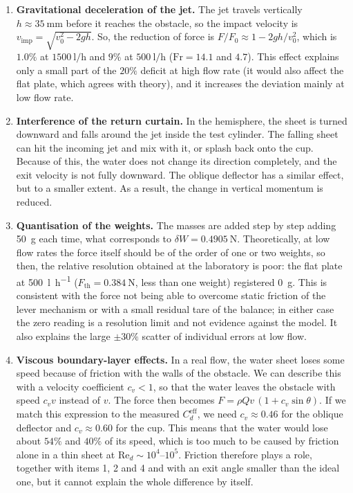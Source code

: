\documentclass[11pt,a4paper]{article}
\numberwithin{equation}{section}
\newcommand{\Cd}{C_d}
\newcommand{\Red}{\mathrm{Re}_d}
\newcommand{\Fth}{F_{\mathrm{th}}}
\begin{document}
\begin{enumerate}[leftmargin=1.5em, itemsep=0.4em]
  \item \textbf{Gravitational deceleration of the jet.} The jet travels vertically $h\approx\SI{35}{\milli\metre}$ before it reaches the obstacle, so the impact velocity is $v_{\mathrm{imp}}=\sqrt{v_0^2-2gh}$. So, the reduction of force is $F/F_0\approx 1-2gh/v_0^2$, which is $1.0\%$ at $\SI{1500}{\litre\per\hour}$ and $9\%$ at $\SI{500}{\litre\per\hour}$ ($\mathrm{Fr}=14.1$ and $4.7$). This effect explains only a small part of the $20\%$ deficit at high flow rate (it would also affect the flat plate, which agrees with theory), and it increases the deviation mainly at low flow rate.
  \item \textbf{Interference of the return curtain.} In the hemisphere, the sheet is turned downward and falls around the jet inside the test cylinder. The falling sheet can hit the incoming jet and mix with it, or splash back onto the cup. Because of this, the water does not change its direction completely, and the exit velocity is not fully downward. The oblique deflector has a similar effect, but to a smaller extent. As a result, the change in vertical momentum is reduced.
  \item \textbf{Quantisation of the weights.} The masses are added step by step adding \SI{50}{\gram} each time, what corresponds to $\delta W=\SI{0.4905}{\newton}$. Theoretically, at low flow rates the force itself should be of the order of one or two weights, so then, the relative resolution obtained at the laboratory is poor: the flat plate at \SI{500}{\litre\per\hour} ($\Fth=\SI{0.384}{\newton}$, less than one weight) registered \SI{0}{\gram}. This is consistent with the force not being able to overcome static friction of the lever mechanism or with a small residual tare of the balance; in either case the zero reading is a resolution limit and not evidence against the model. It also explains the large $\pm30\%$ scatter of individual errors at low flow.
  \item \textbf{Viscous boundary-layer effects.} In a real flow, the water sheet loses some speed because of friction with the walls of the obstacle. We can describe this with a velocity coefficient $c_v<1$, so that the water leaves the obstacle with speed $c_v v$ instead of $v$. The force then becomes $F=\rho Q v\,(1+c_v\sin\theta)$. If we match this expression to the measured $\Cd^{\mathrm{eff}}$, we need $c_v\approx0.46$ for the oblique deflector and $c_v\approx0.60$ for the cup. This means that the water would lose about $54\%$ and $40\%$ of its speed, which is too much to be caused by friction alone in a thin sheet at $\Red\sim10^{4}$--$10^5$. Friction therefore plays a role, together with items 1, 2 and 4 and with an exit angle smaller than the ideal one, but it cannot explain the whole difference by itself.

\end{enumerate}
\end{document}
